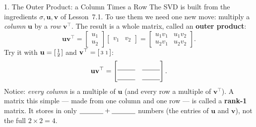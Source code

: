 \documentclass[10pt]{article}
\newcommand{\uu}{\mathbf{u}}
\newcommand{\vv}{\mathbf{v}}
\newcommand{\T}{^{\top}}
\begin{document}
\begin{notesbox}{1. The Outer Product: a Column Times a Row}
The SVD is built from the ingredients $\sigma,\uu,\vv$ of Lesson~7.1. To use them we need one new move:
multiply a \emph{column} $\uu$ by a \emph{row} $\vv\T$. The result is a whole matrix, called an
\textbf{outer product}:
\[
  \uu\vv\T=\begin{bmatrix} u_1\\ u_2 \end{bmatrix}\begin{bmatrix} v_1 & v_2 \end{bmatrix}
  =\begin{bmatrix} u_1v_1 & u_1v_2\\ u_2v_1 & u_2v_2 \end{bmatrix}.
\]
Try it with $\uu=\begin{bsmallmatrix} 1\\2 \end{bsmallmatrix}$ and $\vv\T=\begin{bsmallmatrix} 3 & 1 \end{bsmallmatrix}$:
\[
  \uu\vv\T=\begin{bmatrix}\rule{0pt}{1.1em}\blank{0.9cm} & \blank{0.9cm}\\[2pt]\blank{0.9cm} & \blank{0.9cm}\end{bmatrix}.
\]
Notice: \emph{every column} is a multiple of $\uu$ (and every row a multiple of $\vv\T$). A matrix this
simple --- made from one column and one row --- is called a \textbf{rank-1} matrix. It stores in only
$\blank{1.2cm}+\blank{1.2cm}$ numbers (the entries of $\uu$ and $\vv$), not the full $2\times2=4$.
\end{notesbox}
\end{document}
